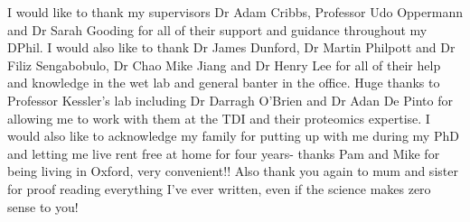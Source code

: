 I would like to thank my supervisors Dr Adam Cribbs, Professor Udo Oppermann and Dr Sarah Gooding for all of their support and guidance throughout my DPhil. I would also like to thank Dr James Dunford, Dr Martin Philpott and Dr Filiz Sengabobulo, Dr Chao Mike Jiang and Dr Henry Lee for all of their help and knowledge in the wet lab and general banter in the office. Huge thanks to Professor Kessler's lab including Dr Darragh O'Brien and Dr Adan De Pinto for allowing me to work with them at the TDI and their proteomics expertise.
I would also like to acknowledge my family for putting up with me during my PhD and letting me live rent free at home for four years- thanks Pam and Mike for being living in Oxford, very convenient!! Also thank you again to mum and sister for proof reading everything I've ever written, even if the science makes zero sense to you!
